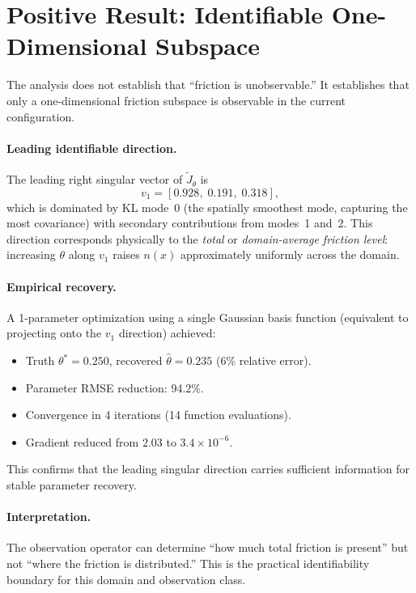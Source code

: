 \documentclass[11pt]{article}
\theoremstyle{definition}
\begin{document}
\section{Positive Result: Identifiable One-Dimensional Subspace}
\label{sec:positive}

The analysis does not establish that ``friction is unobservable.''
It establishes that only a one-dimensional friction subspace is
observable in the current configuration.

\paragraph{Leading identifiable direction.}
The leading right singular vector of $\widetilde{J}_\theta$ is
\[
v_1 = [0.928,\; 0.191,\; 0.318],
\]
which is dominated by KL mode~0 (the spatially smoothest mode,
capturing the most covariance) with secondary contributions from
modes~1 and~2.  This direction corresponds physically to the
\emph{total} or \emph{domain-average friction level}: increasing
$\theta$ along $v_1$ raises $n(x)$ approximately uniformly across
the domain.

\paragraph{Empirical recovery.}
A 1-parameter optimization using a single Gaussian basis function
(equivalent to projecting onto the $v_1$ direction) achieved:
\begin{itemize}
\item Truth $\theta^* = 0.250$, recovered $\hat{\theta} = 0.235$
  (6\% relative error).
\item Parameter RMSE reduction: 94.2\%.
\item Convergence in 4 iterations (14 function evaluations).
\item Gradient reduced from $2.03$ to $3.4 \times 10^{-6}$.
\end{itemize}
This confirms that the leading singular direction carries sufficient
information for stable parameter recovery.

\paragraph{Interpretation.}
The observation operator can determine ``how much total friction is
present'' but not ``where the friction is distributed.''  This is
the practical identifiability boundary for this domain and observation
class.
\end{document}
